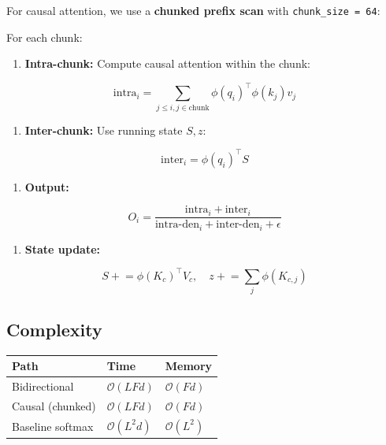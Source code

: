 For causal attention, we use a \textbf{chunked prefix scan} with \texttt{chunk\_size = 64}:

For each chunk:

\begin{enumerate}
\item \textbf{Intra-chunk:} Compute causal attention within the chunk:

\end{enumerate}
\[
\text{intra}_i = \sum_{j \leq i, j \in \text{chunk}} \phi(q_i)^\top \phi(k_j) v_j
\tag{4.3}
\]

\begin{enumerate}
\item \textbf{Inter-chunk:} Use running state $S, z$:

\end{enumerate}
\[
\text{inter}_i = \phi(q_i)^\top S
\tag{4.4}
\]

\begin{enumerate}
\item \textbf{Output:}

\end{enumerate}
\[
O_i = \frac{\text{intra}_i + \text{inter}_i}{\text{intra-den}_i + \text{inter-den}_i + \epsilon}
\tag{4.5}
\]

\begin{enumerate}
\item \textbf{State update:}

\end{enumerate}
\[
S \mathrel{+}= \phi(K_c)^\top V_c, \quad z \mathrel{+}= \sum_j \phi(K_{c,j})
\tag{4.6}
\]

\subsection{Complexity}

\begin{table}[H]
\centering
\small
\begin{tabular}{lll}
\toprule
\textbf{Path} & \textbf{Time} & \textbf{Memory} \\
\midrule
Bidirectional & $\mathcal{O}(L F d)$ & $\mathcal{O}(F d)$ \\
Causal (chunked) & $\mathcal{O}(L F d)$ & $\mathcal{O}(F d)$ \\
Baseline softmax & $\mathcal{O}(L^2 d)$ & $\mathcal{O}(L^2)$ \\
\bottomrule
\end{tabular}
\end{table}

